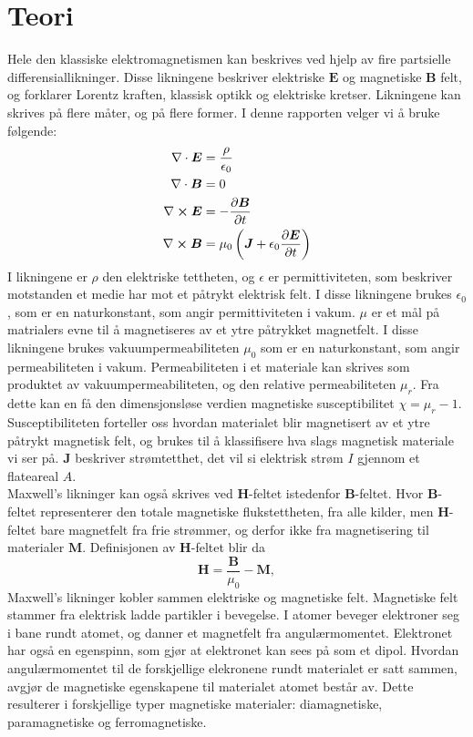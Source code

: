 \documentclass[%
 reprint,
 amsmath,amssymb,
 aps,
 norsk,
]{revtex4-1}
\begin{document}
\section{Teori}
Hele den klassiske elektromagnetismen kan beskrives ved hjelp av fire partsielle differensiallikninger. Disse likningene beskriver elektriske $\bm{E}$ og magnetiske $\bm{B}$ felt, og forklarer Lorentz kraften, klassisk optikk og elektriske kretser. Likningene kan skrives på flere måter, og på flere former. I denne rapporten velger vi å bruke følgende:
\begin{align}
  \nabla \cdot \bm{E} &= \frac{\rho}{\epsilon_0} \label{1}\\
  \nabla \cdot \bm{B} &= 0 \label{2}\\
  \nabla \cross \bm{E} &= -\pdv{\bm{B}}{t} \label{3}\\
  \nabla \cross \bm{B} &= \mu_0\left(\bm{J} + \epsilon_0\pdv{\bm{E}}{t}\right) \label{4}
\end{align}
I likningene er $\rho$ den elektriske tettheten, og $\epsilon$ er permittiviteten, som beskriver motstanden et medie har mot et påtrykt elektrisk felt. I disse likningene brukes $\epsilon_0$, som er en naturkonstant, som angir permittiviteten i vakum. $\mu$ er et mål på matrialers evne til å magnetiseres av et ytre påtrykket magnetfelt. I disse likningene brukes vakuumpermeabiliteten $\mu_0$ som er en naturkonstant, som angir permeabiliteten i vakum. Permeabiliteten i et materiale kan skrives som produktet av vakuumpermeabiliteten, og den relative permeabiliteten $\mu_r$. Fra dette kan en få den dimensjonsløse verdien magnetiske susceptibilitet $\chi = \mu_r - 1$. Susceptibiliteten forteller oss hvordan materialet blir magnetisert av et ytre påtrykt magnetisk felt, og brukes til å klassifisere hva slags magnetisk materiale vi ser på. $\bm{J}$ beskriver strømtetthet, det vil si elektrisk strøm $I$ gjennom et flateareal $A$. \\
Maxwell's likninger kan også skrives ved $\bm{H}$-feltet istedenfor $\bm{B}$-feltet. Hvor $\bm{B}$-feltet representerer den totale magnetiske flukstettheten, fra alle kilder, men $\bm{H}$-feltet bare magnetfelt fra frie strømmer, og derfor ikke fra magnetisering til materialer $\bm{M}$. Definisjonen av $\bm{H}$-feltet blir da
\begin{equation}
  \bm{H} = \frac{\bm{B}}{\mu_0}-\bm{M}, \label{get_H}
\end{equation}
Maxwell's likninger kobler sammen elektriske og magnetiske felt. Magnetiske felt stammer fra elektrisk ladde partikler i bevegelse. I atomer beveger elektroner seg i bane rundt atomet, og danner et magnetfelt fra angulærmomentet. Elektronet har også en egenspinn, som gjør at elektronet kan sees på som et dipol. Hvordan angulærmomentet til de forskjellige elekronene rundt materialet er satt sammen, avgjør de magnetiske egenskapene til materialet atomet består av. Dette resulterer i forskjellige typer magnetiske materialer: diamagnetiske, paramagnetiske og ferromagnetiske.
\end{document}
